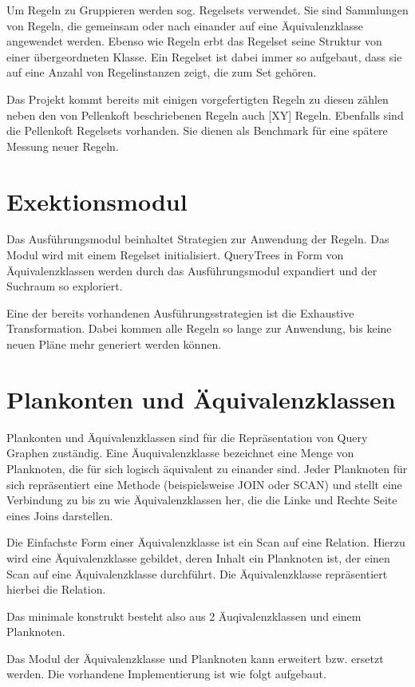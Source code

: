 Um Regeln zu Gruppieren werden sog. Regelsets verwendet. Sie sind Sammlungen von Regeln, die gemeinsam oder nach einander auf eine Äquivalenzklasse angewendet werden. Ebenso wie Regeln erbt das Regelset seine Struktur von einer übergeordneten Klasse. Ein Regelset ist dabei immer so aufgebaut, dass sie auf eine Anzahl von Regelinstanzen zeigt, die zum Set gehören.

Das Projekt kommt bereits mit einigen vorgefertigten Regeln zu diesen zählen neben den von Pellenkoft \cite{} beschriebenen Regeln auch [XY] Regeln. Ebenfalls sind die Pellenkoft Regelsets vorhanden. Sie dienen als Benchmark für eine spätere Messung neuer Regeln.


\section{Exektionsmodul}

Das Ausführungsmodul beinhaltet Strategien zur Anwendung der Regeln. Das Modul wird mit einem Regelset initialisiert. QueryTrees in Form von Äquivalenzklassen werden durch das Ausführungsmodul expandiert und der Suchraum so exploriert.

Eine der bereits vorhandenen Ausführungsstrategien ist die Exhaustive Transformation. Dabei kommen alle Regeln so lange zur Anwendung, bis keine neuen Pläne mehr generiert werden können.


\section{Plankonten und Äquivalenzklassen}

Plankonten und Äquivalenzklassen sind für die Repräsentation von Query Graphen zuständig. Eine Äuquivalenzklasse bezeichnet eine Menge von Planknoten, die für sich logisch äquivalent zu einander sind. Jeder Planknoten für sich repräsentiert eine Methode (beispielsweise JOIN oder SCAN) und stellt eine Verbindung zu bis zu wie Äquivalenzklassen her, die die Linke und Rechte Seite eines Joins darstellen.

Die Einfachste Form einer Äquivalenzklasse ist ein Scan auf eine Relation. Hierzu wird eine Äquivalenzklasse gebildet, deren Inhalt ein Planknoten ist, der einen Scan auf eine Äquivalenzklasse durchführt. Die Äquivalenzklasse repräsentiert hierbei die Relation.

Das minimale konstrukt besteht also aus 2 Äuqivalenzklassen und einem Planknoten.


Das Modul der Äquivalenzklasse und Planknoten kann erweitert bzw. ersetzt werden. Die vorhandene Implementierung ist wie folgt aufgebaut.
